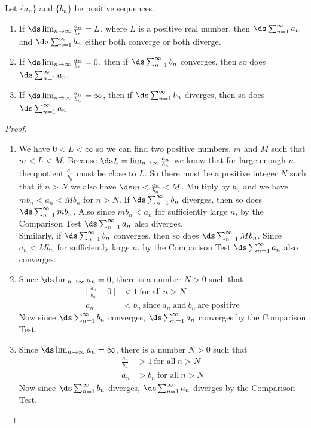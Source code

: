 {Let $\{a_n\}$ and $\{b_n\}$ be positive sequences.
\begin{enumerate}
	\item If $\ds\lim_{n\to\infty} \frac{a_n}{b_n} = L$, where $L$ is a positive real number, then $\ds \sum_{n=1}^\infty a_n$ and $\ds \sum_{n=1}^\infty b_n$ either both converge or both diverge.
	\item	If $\ds\lim_{n\to\infty} \frac{a_n}{b_n} = 0$, then if $\ds \sum_{n=1}^\infty b_n$ converges, then so does $\ds \sum_{n=1}^\infty a_n$.
	\item	If $\ds\lim_{n\to\infty} \frac{a_n}{b_n} = \infty$, then if $\ds \sum_{n=1}^\infty b_n$ diverges, then so does $\ds \sum_{n=1}^\infty a_n$.
\end{enumerate}}

\begin{proof}
\begin{enumerate}
\item We have $0<L<\infty$ so we can find two positive numbers, $m$ and $M$ such that $m<L<M$. Because $\ds L=\lim_{n\to\infty} \frac{a_n}{b_n}$ we know that for large enough $n$ the quotient $\frac{a_n}{b_n}$ must be close to $L$. So there must be a positive integer $N$ such that if $n>N$ we also have $\ds m<\frac{a_n}{b_n}<M$. Multiply by $b_n$ and we have $mb_n<a_n<Mb_n$ for $n>N$. If $\ds \sum_{n=1}^\infty b_n$ diverges, then so does $\ds \sum_{n=1}^\infty mb_n$. Also since $mb_n<a_n$ for sufficiently large $n$, by the Comparison Test $\ds \sum_{n=1}^\infty a_n$ also diverges. \\
Similarly, if $\ds \sum_{n=1}^\infty b_n$ converges, then so does $\ds \sum_{n=1}^\infty Mb_n$. Since $a_n<Mb_n$ for sufficiently large $n$, by the Comparison Test $\ds \sum_{n=1}^\infty a_n$ also converges.
\item Since $\ds \lim_{n\to\infty} a_n =0$, there is a number $N>0$ such that 
\begin{align*}
\biggl|~\frac{a_n}{b_n} -0~\biggr|&<1~ \text{for all}~ n>N \\
a_n&<b_n ~\text{since}~a_n~\text{and}~b_n~\text{are positive}
\end{align*}
Now since $\ds \sum_{n=1}^\infty b_n$ converges, $\ds \sum_{n=1}^\infty a_n$ converges by the Comparison Test.
\item Since $\ds \lim_{n\to\infty} a_n =\infty$, there is a number $N>0$ such that 
\begin{align*}
\frac{a_n}{b_n}&>1~ \text{for all}~ n>N \\
a_n&>b_n ~ \text{for all}~ n>N 
\end{align*}
Now since $\ds \sum_{n=1}^\infty b_n$ diverges, $\ds \sum_{n=1}^\infty a_n$ diverges by the Comparison Test.\qedhere
\end{enumerate}
\end{proof}


